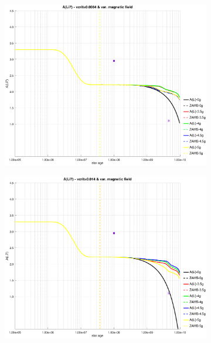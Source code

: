 \documentclass[fleqn,usenatbib]{mnras}
\begin{document}
\begin{figure}
    \centering
    \begin{subfigure}[h]{0.47\textwidth}
    \includegraphics[trim = 40mm 15mm 15mm 15mm, clip,width=\textwidth]{figures/li_vc_0084_var_g.eps}
    \label{fig:subim21}
    \end{subfigure}
    \begin{subfigure}[h]{0.47\textwidth}
    \includegraphics[trim = 40mm 15mm 15mm 15mm, clip,width=\textwidth]{figures/li_vc_014_var_g.eps}
    \label{fig:subim22}
    \end{subfigure}
    \begin{subfigure}[h]{0.47\textwidth}

\end{subfigure}
\end{figure}
\end{document}
